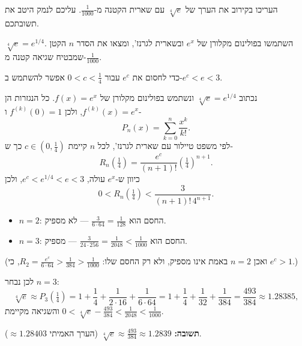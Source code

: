 
\begin{question}
העריכו בקירוב את הערך של $\sqrt[4]{e}$ עם שארית הקטנה מ-$\frac{1}{1000}$. עליכם לנמק היטב את תשובתכם.
\end{question}

\begin{hint}
$\sqrt[4]{e}=e^{1/4}$. השתמשו בפולינום מקלורן של $e^x$ ובשארית לגרנז', ומצאו את הסדר $n$ הקטן שמבטיח שגיאה קטנה מ-$\frac{1}{1000}$.
\end{hint}

\begin{hint}
כדי לחסום את $e^c$ עבור $0<c<\frac14$ אפשר להשתמש ב-$e^c<e<3$.
\end{hint}

\begin{solution}
נכתוב $\sqrt[4]{e}=e^{1/4}$ ונשתמש בפולינום מקלורן של $f(x)=e^x$. כל הנגזרות הן $f^{(k)}(x)=e^x$, ולכן $f^{(k)}(0)=1$ ו-
\[ P_n(x)=\sum_{k=0}^n\frac{x^k}{k!}. \]
לפי משפט טיילור עם שארית לגרנז', לכל $n$ קיימת $c\in(0,\tfrac14)$ כך ש-
\[ R_n\left(\tfrac14\right)=\frac{e^c}{(n+1)!}\left(\tfrac14\right)^{n+1}. \]
כיוון ש-$e^x$ עולה, $e^c<e^{1/4}<e<3$, ולכן
\[ 0<R_n\left(\tfrac14\right)<\frac{3}{(n+1)!\,4^{n+1}}. \]
\begin{itemize}
  \item $n=2$: החסם הוא $\frac{3}{6\cdot64}=\frac{1}{128}$ — לא מספיק.
  \item $n=3$: החסם הוא $\frac{3}{24\cdot256}=\frac{1}{2048}<\frac{1}{1000}$ — מספיק.
\end{itemize}
(ואכן $n=2$ באמת אינו מספיק, ולא רק החסם שלו: $R_2=\frac{e^c}{6\cdot64}>\frac{1}{384}>\frac1{1000}$, כי $e^c>1$.)

לכן נבחר $n=3$:
\[ \sqrt[4]{e}\approx P_3\left(\tfrac14\right)=1+\frac14+\frac{1}{2\cdot16}+\frac{1}{6\cdot64}=1+\frac14+\frac1{32}+\frac1{384}=\frac{493}{384}\approx1.28385, \]
והשגיאה מקיימת $0<\sqrt[4]{e}-\frac{493}{384}<\frac{1}{2048}<\frac{1}{1000}$.

\textbf{תשובה:} $\boxed{\sqrt[4]{e}\approx\frac{493}{384}\approx1.2839}$ (הערך האמיתי $\approx1.28403$).
\end{solution}
